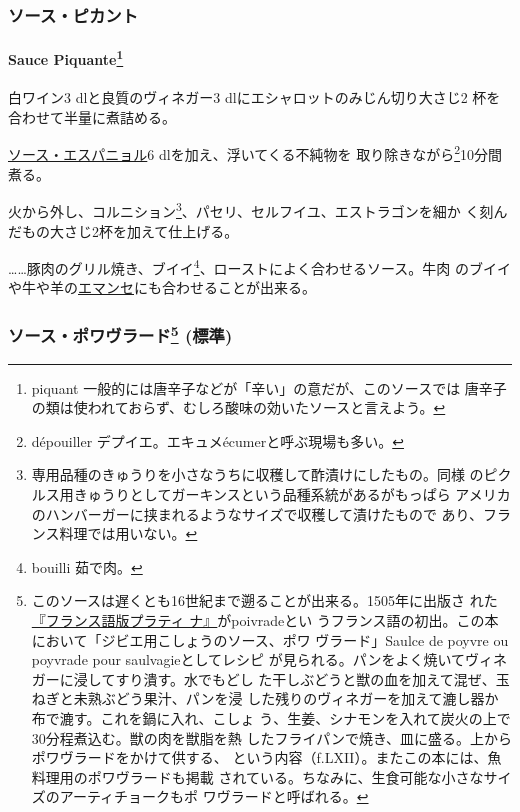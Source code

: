\begin{recette}
\maeaki

\hypertarget{ux30bdux30fcux30b9ux30d4ux30abux30f3ux30c8}{%
\subsubsection{ソース・ピカント}\label{ux30bdux30fcux30b9ux30d4ux30abux30f3ux30c8}}

\hypertarget{sauce-piquante}{%
\paragraph[Sauce Piquante]{\texorpdfstring{Sauce Piquante\footnote{piquant
  一般的には唐辛子などが「辛い」の意だが、このソースでは
  唐辛子の類は使われておらず、むしろ酸味の効いたソースと言えよう。}}{Sauce Piquante}}\label{sauce-piquante}}


白ワイン3 dlと良質のヴィネガー3 dlにエシャロットのみじん切り大さじ2
\undemi{}杯を合わせて半量に煮詰める。

\protect\hyperlink{sauce-espagnole}{ソース・エスパニョル}6
dlを加え、浮いてくる不純物を 取り除きながら\footnote{dépouiller
  デプイエ。エキュメécumerと呼ぶ現場も多い。}10分間煮る。

火から外し、コルニション\footnote{専用品種のきゅうりを小さなうちに収穫して酢漬けにしたもの。同様
  のピクルス用きゅうりとしてガーキンスという品種系統があるがもっぱら
  アメリカのハンバーガーに挟まれるようなサイズで収穫して漬けたもので
  あり、フランス料理では用いない。}、パセリ、セルフイユ、エストラゴンを細か
く刻んだもの大さじ2杯を加えて仕上げる。

\ldots{}\ldots{}豚肉のグリル焼き、ブイイ\footnote{bouilli 茹で肉。}、ローストによく合わせるソース。牛肉
のブイイや牛や羊の\protect\hyperlink{}{エマンセ}にも合わせることが出来る。

\maeaki

\hypertarget{ux30bdux30fcux30b9ux30ddux30efux30f4ux30e9ux30fcux30c9105-ux6a19ux6e96}{%
\subsubsection[ソース・ポワヴラード
(標準)]{\texorpdfstring{ソース・ポワヴラード\footnote{このソースは遅くとも16世紀まで遡ることが出来る。1505年に出版さ
  れた\href{http://gallica.bnf.fr/ark:/12148/bpt6k792720}{『フランス語版プラティ
  ナ』}がpoivradeとい
  うフランス語の初出。この本において「ジビエ用こしょうのソース、ポワ
  ヴラード」Saulce de poyvre ou poyvrade pour saulvagieとしてレシピ
  が見られる。パンをよく焼いてヴィネガーに浸してすり潰す。水でもどし
  た干しぶどうと獣の血を加えて混ぜ、玉ねぎと未熟ぶどう果汁、パンを浸
  した残りのヴィネガーを加えて漉し器か布で漉す。これを鍋に入れ、こしょ
  う、生姜、シナモンを入れて炭火の上で30分程煮込む。獣の肉を獣脂を熱
  したフライパンで焼き、皿に盛る。上からポワヴラードをかけて供する、
  という内容（f.LXII）。またこの本には、魚料理用のポワヴラードも掲載
  されている。ちなみに、生食可能な小さなサイズのアーティチョークもポ
  ワヴラードと呼ばれる。}
(標準)}{ソース・ポワヴラード (標準)}}\label{ux30bdux30fcux30b9ux30ddux30efux30f4ux30e9ux30fcux30c9105-ux6a19ux6e96}}


\end{recette}
